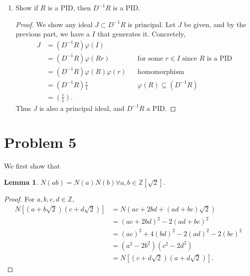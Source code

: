 \documentclass{article}
\theoremstyle{plain}
\newtheorem*{lemma*}{Lemma}
\newcommand{\Z}{\mathbb{Z}}
\begin{document}
\begin{enumerate}
\begin{proof}
\begin{enumerate}
  \item $I$ generates $J$, ie. $(D^{-1}R)\varphi(I) = (D^{-1}R)(R'\cap J) = J$.

  Here is a useful characterization: $I=\varphi^{-1}(R'\cap J)=\{r\in R|\frac{r}{1}\in J\}$.

          \underline{($\supseteq$)}: Given any $\frac{r}{d}\in J$ where $r\in R, d\in D$, we have
          $\frac{1}{d}\cdot\frac{r}{1}\in (D^{-1}R)(R'\cap J)$.

          \underline{($\subseteq$)}: This is trivial since $(R'\cap J)\subseteq J$, which implies
          $(D^{-1}R)(R'\cap J)\subseteq(D^{-1}R)J\subseteq J$.
  \end{enumerate}
\end{proof}
\item Show if $R$ is a PID, then $D^{-1}R$ is a PID.
\begin{proof}
  We show any ideal $J\subset D^{-1}R$ is principal. Let $J$ be given, and by the
  previous part, we have a $I$ that generates it. Concretely,
  \begin{align*}
    J &= (D^{-1}R)\varphi(I)\\
      &= (D^{-1}R)\varphi(Rr)&& \text{for some $r\in I$ since $R$ is a PID}\\
      &= (D^{-1}R)\varphi(R)\varphi(r)&& \text{homomorphism}\\
      &= (D^{-1}R)\frac{r}{1}&& \varphi(R)\subseteq (D^{-1}R)\\
      &=(\frac{r}{1}).
  \end{align*}
  Thus $J$ is also a principal ideal, and $D^{-1}R$ a PID.

\end{proof}
\end{enumerate}

\section*{Problem 5}
We first show that
\begin{lemma*} $N(ab)=N(a)N(b)\forall a,b\in\Z[\sqrt{2}]$. \end{lemma*}
\begin{proof}
  For $a, b, c, d\in\Z$,
  \begin{align*}
    N[(a+b\sqrt{2})(c+d\sqrt{2})] &= N(ac+2bd+(ad+bc)\sqrt{2})\\
                                  &=(ac+2bd)^{2}-2(ad+bc)^{2}\\
                                  &=(ac)^{2}+4(bd)^{2}-2(ad)^{2}-2(bc)^{2}\\
                                  &=(a^{2}-2b^{2})(c^{2}-2d^{2})\\
                                  &=N[(c+d\sqrt{2})(a+d\sqrt{2})].
  \end{align*}
\end{proof}
\end{document}

